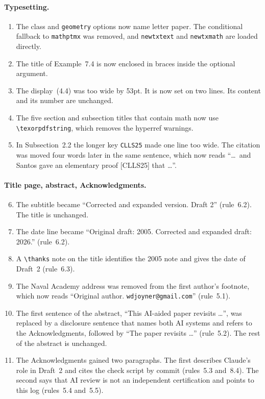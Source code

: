 \documentclass[12pt,letterpaper]{article}
\begin{document}
\paragraph{Typesetting.}
\begin{enumerate}
\item The class and \texttt{geometry} options now name letter paper. The
conditional fallback to \texttt{mathptmx} was removed, and \texttt{newtxtext} and
\texttt{newtxmath} are loaded directly.
\item The title of Example~7.4 is now enclosed in braces inside the optional
argument.
\item The display~(4.4) was too wide by 53pt. It is now set on two lines. Its
content and its number are unchanged.
\item The five section and subsection titles that contain math now use
\verb|\texorpdfstring|, which removes the hyperref warnings.
\item In Subsection~2.2 the longer key \texttt{CLLS25} made one line too wide. The
citation was moved four words later in the same sentence, which now reads
``\dots\ and Santos gave an elementary proof [CLLS25] that \dots''.
\end{enumerate}

\paragraph{Title page, abstract, Acknowledgments.}
\begin{enumerate}
\setcounter{enumi}{5}
\item The subtitle became ``Corrected and expanded version. Draft 2'' (rule~6.2).
The title is unchanged.
\item The date line became ``Original draft: 2005. Corrected and expanded draft:
2026.'' (rule~6.2).
\item A \verb|\thanks| note on the title identifies the 2005 note and gives the
date of Draft~2 (rule~6.3).
\item The Naval Academy address was removed from the first author's footnote,
which now reads ``Original author. \texttt{wdjoyner@gmail.com}'' (rule~5.1).
\item The first sentence of the abstract, ``This AI-aided paper revisits \dots'',
was replaced by a disclosure sentence that names both AI systems and refers to
the Acknowledgments, followed by ``The paper revisits \dots'' (rule~5.2). The
rest of the abstract is unchanged.
\item The Acknowledgments gained two paragraphs. The first describes Claude's
role in Draft~2 and cites the check script by commit (rules~5.3 and~8.4). The
second says that AI review is not an independent certification and points to
this log (rules~5.4 and~5.5).
\end{enumerate}
\end{document}
